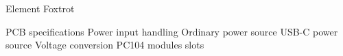 
\chap Element Foxtrot

\sec PCB specifications
\sec Power input handling
\secc Ordinary power source
\secc USB-C power source
\sec Voltage conversion
\sec PC104 modules slots
